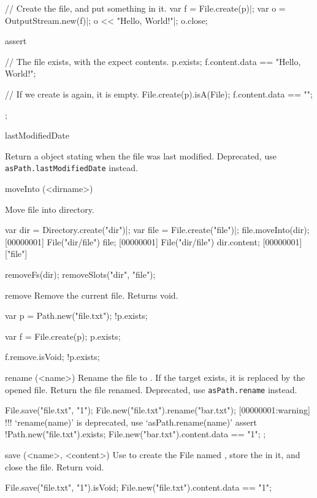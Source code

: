 \begin{urbiscriptapi}
\begin{urbiscript}
// Create the file, and put something in it.
var f = File.create(p)|;
var o = OutputStream.new(f)|;
o << "Hello, World!"|;
o.close;

assert
{
  // The file exists, with the expect contents.
  p.exists;
  f.content.data == "Hello, World!";

  // If we create is again, it is empty.
  File.create(p).isA(File);
  f.content.data == "";
};
\end{urbiscript}


\item[lastModifiedDate]
  \experimental{}

  Return a  object stating when the file was last modified.
  Deprecated, use \lstinline|asPath.lastModifiedDate| instead.


\item[moveInto](<dirname>)
  \experimental{}

  Move file into  directory.
\begin{urbiscript}
var dir = Directory.create("dir")|;
var file = File.create("file")|;
file.moveInto(dir);
[00000001] File("dir/file")
file;
[00000001] File("dir/file")
dir.content;
[00000001] ["file"]
\end{urbiscript}
\begin{urbicomment}
removeFs(dir);
removeSlots("dir", "file");
\end{urbicomment}


\item[remove]%
  Remove the current file.  Returns void.
\begin{urbiassert}[firstnumber=1]
var p = Path.new("file.txt");
!p.exists;

var f = File.create(p);
p.exists;

f.remove.isVoid;
!p.exists;
\end{urbiassert}


\item[rename](<name>)%
  Rename the file to .  If the target exists, it is replaced by
  the opened file. Return the file renamed.
  Deprecated, use \lstinline|asPath.rename| instead.
\begin{urbiscript}
File.save("file.txt", "1\n");
File.new("file.txt").rename("bar.txt");
[00000001:warning] !!! `rename(name)' is deprecated, use `asPath.rename(name)'
assert
{
  !Path.new("file.txt").exists;
  File.new("bar.txt").content.data == "1\n";
};
\end{urbiscript}


\item[save](<name>, <content>)
  Use  to create the File named , store the
   in it, and close the file.  Return void.
\begin{urbiassert}
File.save("file.txt", "1\n").isVoid;
File.new("file.txt").content.data == "1\n";
\end{urbiassert}



\end{urbiscriptapi}
